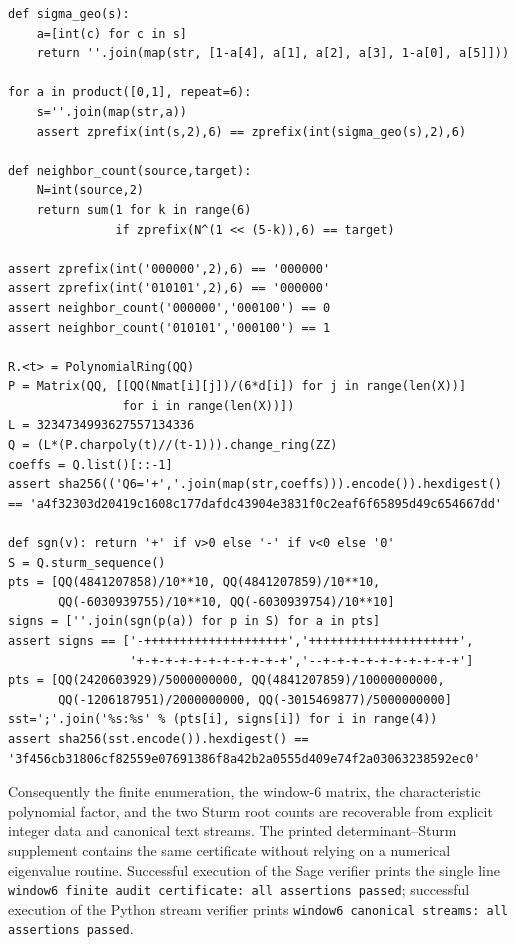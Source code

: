 \begin{proposition}
\begin{enumerate}[label=\textup{(\roman*)}]
\begin{Verbatim}[breaklines=true,breakanywhere=true,fontsize=\scriptsize]
def sigma_geo(s):
    a=[int(c) for c in s]
    return ''.join(map(str, [1-a[4], a[1], a[2], a[3], 1-a[0], a[5]]))

for a in product([0,1], repeat=6):
    s=''.join(map(str,a))
    assert zprefix(int(s,2),6) == zprefix(int(sigma_geo(s),2),6)

def neighbor_count(source,target):
    N=int(source,2)
    return sum(1 for k in range(6)
               if zprefix(N^(1 << (5-k)),6) == target)

assert zprefix(int('000000',2),6) == '000000'
assert zprefix(int('010101',2),6) == '000000'
assert neighbor_count('000000','000100') == 0
assert neighbor_count('010101','000100') == 1

R.<t> = PolynomialRing(QQ)
P = Matrix(QQ, [[QQ(Nmat[i][j])/(6*d[i]) for j in range(len(X))]
                for i in range(len(X))])
L = 3234734993627557134336
Q = (L*(P.charpoly(t)//(t-1))).change_ring(ZZ)
coeffs = Q.list()[::-1]
assert sha256(('Q6='+','.join(map(str,coeffs))).encode()).hexdigest() == 'a4f32303d20419c1608c177dafdc43904e3831f0c2eaf6f65895d49c654667dd'

def sgn(v): return '+' if v>0 else '-' if v<0 else '0'
S = Q.sturm_sequence()
pts = [QQ(4841207858)/10**10, QQ(4841207859)/10**10,
       QQ(-6030939755)/10**10, QQ(-6030939754)/10**10]
signs = [''.join(sgn(p(a)) for p in S) for a in pts]
assert signs == ['-++++++++++++++++++++','+++++++++++++++++++++',
                 '+-+-+-+-+-+-+-+-+-+-+','--+-+-+-+-+-+-+-+-+-+']
pts = [QQ(2420603929)/5000000000, QQ(4841207859)/10000000000,
       QQ(-1206187951)/2000000000, QQ(-3015469877)/5000000000]
sst=';'.join('%s:%s' % (pts[i], signs[i]) for i in range(4))
assert sha256(sst.encode()).hexdigest() == '3f456cb31806cf82559e07691386f8a42b2a0555d409e74f2a03063238592ec0'
\end{Verbatim}
\end{enumerate}
Consequently the finite enumeration, the window-\(6\) matrix, the characteristic polynomial factor, and the two Sturm root counts are recoverable from explicit integer data and canonical text streams.  The printed determinant--Sturm supplement contains the same certificate without relying on a numerical eigenvalue routine.  Successful execution of the Sage verifier prints the single line \texttt{window6 finite audit certificate: all assertions passed}; successful execution of the Python stream verifier prints \texttt{window6 canonical streams: all assertions passed}.
\end{proposition}
